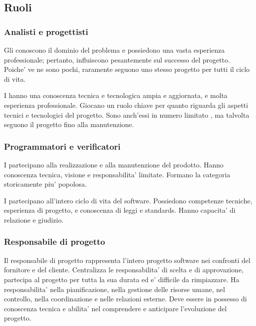 \subsection{Ruoli}

\subsubsection{Analisti e progettisti}
Gli  conoscono il dominio del problema e possiedono una vasta esperienza professionale; pertanto, influiscono pesantemente sul successo del progetto. Poiche' ve ne sono pochi, raramente seguono uno stesso progetto per tutti il ciclo di vita. 

I  hanno una conoscenza tecnica e tecnologica ampia e aggiornata, e molta esperienza professionale. Giocano un ruolo chiave per quanto riguarda gli aspetti tecnici e tecnologici del progetto. Sono anch'essi in numero limitato , ma talvolta seguono il progetto fino alla manutenzione.

\subsubsection{Programmatori e verificatori}
I  partecipano alla realizzazione e alla manutenzione del prodotto. Hanno conoscenza tecnica, visione e responsabilita' limitate. Formano la categoria storicamente piu' popolosa.

I  partecipano all'intero ciclo di vita del software. Possiedono competenze tecniche, esperienza di progetto, e conoscenza di leggi e standards. Hanno capacita' di relazione e giudizio.

\subsubsection{Responsabile di progetto}
Il responsabile di progetto rappresenta l'intero progetto software nei confronti del fornitore e del cliente. Centralizza le responsabilita' di scelta e di approvazione, partecipa al progetto per tutta la sua durata ed e' difficile da rimpiazzare. Ha responsabilita' nella pianificazione, nella gestione delle risorse umane, nel controllo, nella coordinazione e nelle relazioni esterne. Deve essere in possesso di conoscenza tecnica e abilita' nel comprendere e anticipare l'evoluzione del progetto.

